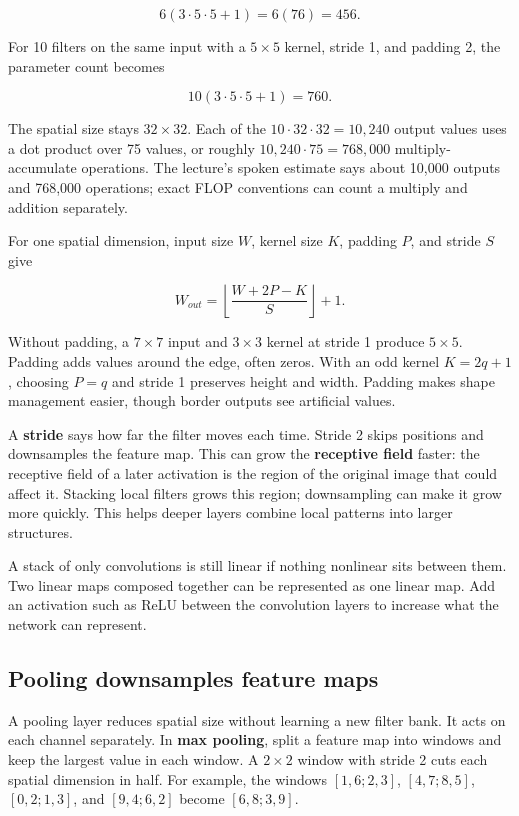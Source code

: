 \[6(3\cdot5\cdot5+1)=6(76)=456.\]

For 10 filters on the same input with a \(5\times5\) kernel, stride 1, and padding 2, the parameter count becomes

\[10(3\cdot5\cdot5+1)=760.\]

The spatial size stays \(32\times32\). Each of the \(10\cdot32\cdot32=10{,}240\) output values uses a dot product over 75 values, or roughly \(10{,}240\cdot75=768{,}000\) multiply-accumulate operations. The lecture's spoken estimate says about 10,000 outputs and 768,000 operations; exact FLOP conventions can count a multiply and addition separately.

For one spatial dimension, input size \(W\), kernel size \(K\), padding \(P\), and stride \(S\) give

\[W_{out}=\left\lfloor\frac{W+2P-K}{S}\right\rfloor+1.\]

Without padding, a \(7\times7\) input and \(3\times3\) kernel at stride 1 produce \(5\times5\). Padding adds values around the edge, often zeros. With an odd kernel \(K=2q+1\), choosing \(P=q\) and stride 1 preserves height and width. Padding makes shape management easier, though border outputs see artificial values.

A \textbf{stride} says how far the filter moves each time. Stride 2 skips positions and downsamples the feature map. This can grow the \textbf{receptive field} faster: the receptive field of a later activation is the region of the original image that could affect it. Stacking local filters grows this region; downsampling can make it grow more quickly. This helps deeper layers combine local patterns into larger structures.

A stack of only convolutions is still linear if nothing nonlinear sits between them. Two linear maps composed together can be represented as one linear map. Add an activation such as ReLU between the convolution layers to increase what the network can represent.

\subsection{Pooling downsamples feature maps}\label{04-visual-computing-ii-ch031-pooling-downsamples-feature-maps}

\hypertarget{04-visual-computing-ii-ch031-pooling-downsamples-feature-maps}{}

A pooling layer reduces spatial size without learning a new filter bank. It acts on each channel separately. In \textbf{max pooling}, split a feature map into windows and keep the largest value in each window. A \(2\times2\) window with stride 2 cuts each spatial dimension in half. For example, the windows \([1,6;2,3]\), \([4,7;8,5]\), \([0,2;1,3]\), and \([9,4;6,2]\) become \([6,8;3,9]\).

